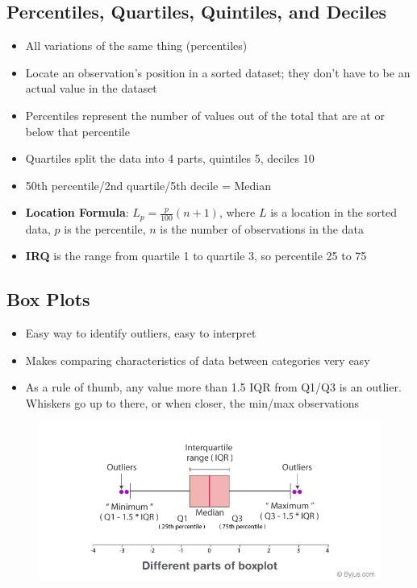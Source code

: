 \documentclass{article}
\begin{document}
\subsection{Percentiles, Quartiles, Quintiles, and Deciles}

\begin{itemize}
    \item All variations of the same thing (percentiles)
    \item Locate an observation's position in a sorted dataset; they don't have to be an actual value in the dataset
    \item Percentiles represent the number of values out of the total that are at or below that percentile
    \item Quartiles split the data into 4 parts, quintiles 5, deciles 10
    \item 50th percentile/2nd quartile/5th decile = Median
    \item \textbf{Location Formula}: $L_p = \frac{p}{100}(n+1)$, where $L$ is a location in the sorted data, $p$ is the percentile, $n$ is the number of observations in the data
    \item \textbf{IRQ} is the range from quartile 1 to quartile 3, so percentile 25 to 75
\end{itemize}

\subsection{Box Plots}

\begin{itemize}
    \item Easy way to identify outliers, easy to interpret
    \item Makes comparing characteristics of data between categories very easy
    \item As a rule of thumb, any value more than 1.5 IQR from Q1/Q3 is an outlier. Whiskers go up to there, or when closer, the min/max observations
\end{itemize}

\begin{figure}
    \includegraphics[width=1.0\linewidth]{Box-Plot-and-Whisker-Plot.png}
\end{figure}
\end{document}

